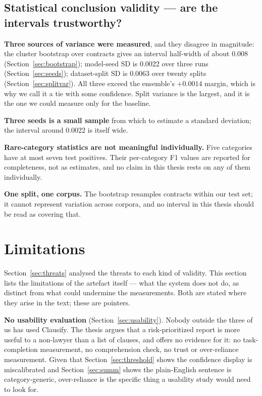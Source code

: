 \subsection{Statistical conclusion validity --- are the intervals trustworthy?}
\textbf{Three sources of variance were measured}, and they disagree in magnitude: the cluster bootstrap over contracts gives an interval half-width of about 0.008 (Section~\ref{sec:bootstrap}); model-seed SD is 0.0022 over three runs (Section~\ref{sec:seeds}); dataset-split SD is 0.0063 over twenty splits (Section~\ref{sec:splitvar}). All three exceed the ensemble's $+0.0014$ margin, which is why we call it a tie with some confidence. Split variance is the largest, and it is the one we could measure only for the baseline.

\textbf{Three seeds is a small sample} from which to estimate a standard deviation; the interval around 0.0022 is itself wide.

\textbf{Rare-category statistics are not meaningful individually.} Five categories have at most seven test positives. Their per-category F1 values are reported for completeness, not as estimates, and no claim in this thesis rests on any of them individually.

\textbf{One split, one corpus.} The bootstrap resamples contracts within our test set; it cannot represent variation across corpora, and no interval in this thesis should be read as covering that.

\section{Limitations}
Section~\ref{sec:threats} analysed the threats to each kind of validity. This section lists the limitations of the artefact itself --- what the system does not do, as distinct from what could undermine the measurements. Both are stated where they arise in the text; these are pointers.

\textbf{No usability evaluation} (Section~\ref{sec:usability}). Nobody outside the three of us has used Clausify. The thesis argues that a risk-prioritized report is more useful to a non-lawyer than a list of clauses, and offers no evidence for it: no task-completion measurement, no comprehension check, no trust or over-reliance measurement. Given that Section~\ref{sec:threshold} shows the confidence display is miscalibrated and Section~\ref{sec:summ} shows the plain-English sentence is category-generic, over-reliance is the specific thing a usability study would need to look for.

